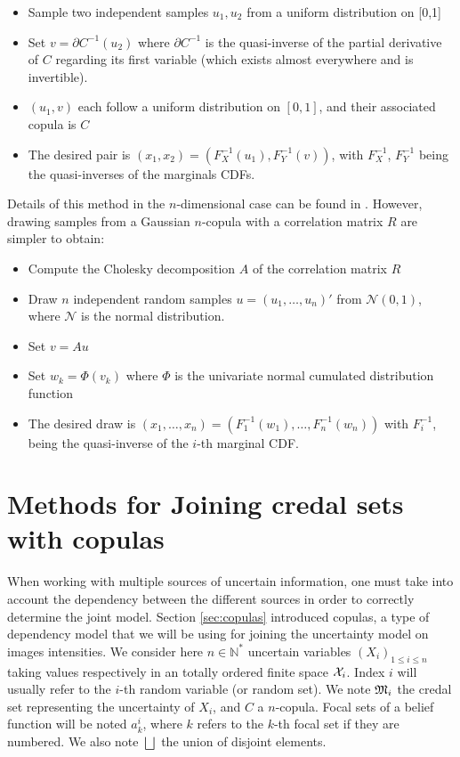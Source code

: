 \begin{itemize}
    \item Sample two independent samples $u_1, u_2$ from a uniform distribution on [0,1]
    \item Set $v=\partial C^{-1}(u_2)$ where $\partial C^{-1}$ is the quasi-inverse of the partial derivative of $C$ regarding its first variable (which exists almost everywhere and is invertible).
    \item $(u_1, v)$ each follow a uniform distribution on $[0,1]$, and their associated copula is $C$ 
    \item The desired pair is $(x_1,x_2) = (F^{-1}_X(u_1), F^{-1}_Y(v))$, with $F_X^{-1}$, $F_Y^{-1}$ being the quasi-inverses of the marginals CDFs.
\end{itemize}

Details of this method in the $n$-dimensional case can be found in \cite{cherubini_copula_2004}. However, drawing samples from a Gaussian $n$-copula with a correlation matrix $R$ are simpler to obtain:
\begin{itemize}
    \item Compute the Cholesky decomposition $A$ of the correlation matrix $R$
    \item Draw $n$ independent random samples $u=(u_1, \dots, u_n)'$ from $\mathcal{N}(0,1)$, where $\mathcal{N}$ is the normal distribution.
    \item Set $v=Au$
    \item Set $w_k=\Phi(v_k)$ where $\Phi$ is the univariate normal cumulated distribution function
    \item The desired draw is $(x_1,\dots, x_n)=(F^{-1}_1(w_1), \dots, F^{-1}_n(w_n))$ with $F_i^{-1}$, being the quasi-inverse of the $i$-th marginal CDF.
\end{itemize}

\section{Methods for Joining credal sets with copulas}
When working with multiple sources of uncertain information, one must take into account the dependency between the different sources in order to correctly determine the joint model. Section \ref{sec:copulas} introduced copulas, a type of dependency model that we will be using for joining the uncertainty model on images intensities. We consider here $n\in\mathbb{N}^*$ uncertain variables $(X_i)_{1\leqslant i\leqslant n}$ taking values respectively in an totally ordered finite space ${\mathcal{X}}_i$. Index $i$ will usually refer to the $i$-th random variable (or random set). We note ${\mathfrak{M}}_i$ the credal set representing the uncertainty of $X_i$, and $C$ a $n$-copula. Focal sets of a belief function will be noted $a^i_k$, where $k$ refers to the $k$-th focal set if they are numbered. We also note $\bigsqcup$ the union of disjoint elements.

